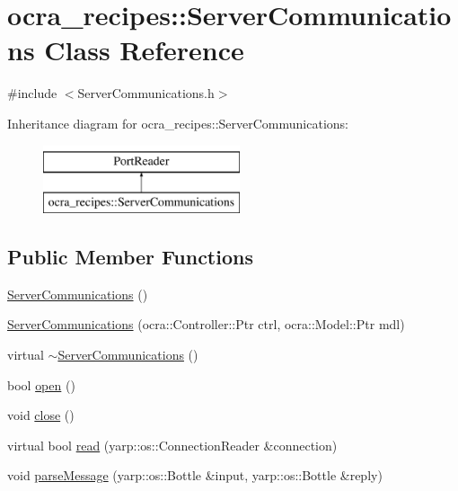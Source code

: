 \hypertarget{classocra__recipes_1_1ServerCommunications}{}\section{ocra\+\_\+recipes\+:\+:Server\+Communications Class Reference}
\label{classocra__recipes_1_1ServerCommunications}


{\ttfamily \#include $<$Server\+Communications.\+h$>$}

Inheritance diagram for ocra\+\_\+recipes\+:\+:Server\+Communications\+:\begin{figure}[H]
\begin{center}
\leavevmode
\includegraphics[height=2.000000cm]{d9/d94/classocra__recipes_1_1ServerCommunications}
\end{center}
\end{figure}
\subsection*{Public Member Functions}
\begin{DoxyCompactItemize}
\item 
\hyperlink{classocra__recipes_1_1ServerCommunications_aa2a8a9d66c8ade82af5f27d550423370}{Server\+Communications} ()
\item 
\hyperlink{classocra__recipes_1_1ServerCommunications_acfb66941fd506637d019a620628a6c42}{Server\+Communications} (ocra\+::\+Controller\+::\+Ptr ctrl, ocra\+::\+Model\+::\+Ptr mdl)
\item 
virtual \hyperlink{classocra__recipes_1_1ServerCommunications_a1a24bf1fe5d2776e0cc9d3910ae226b9}{$\sim$\+Server\+Communications} ()
\item 
bool \hyperlink{classocra__recipes_1_1ServerCommunications_afef1a369ff040f5c774cd5d9533a817f}{open} ()
\item 
void \hyperlink{classocra__recipes_1_1ServerCommunications_a412d7330d0fcb83a51a105d4a261e5db}{close} ()
\item 
virtual bool \hyperlink{classocra__recipes_1_1ServerCommunications_a3a3430656af5150bb28b2012c3cd7004}{read} (yarp\+::os\+::\+Connection\+Reader \&connection)
\item 
void \hyperlink{classocra__recipes_1_1ServerCommunications_a66c219902af82f3edb98652c31093c45}{parse\+Message} (yarp\+::os\+::\+Bottle \&input, yarp\+::os\+::\+Bottle \&reply)
\end{DoxyCompactItemize}


